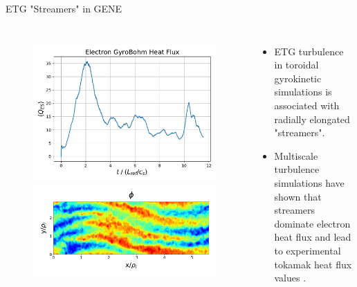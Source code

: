 \documentclass[aspectratio=43]{beamer}
\begin{document}
   \begin{frame}{ETG "Streamers" in GENE}
      \begin{columns}
         \begin{figure}
            \hspace*{-.3cm}\includegraphics[scale=.3]{Images/etgHeatFlux.pdf}
            \hspace*{-.3cm}\includegraphics[scale=.2]{Images/genePhiETG_sat2.pdf}
         \end{figure}
         \begin{itemize}
            \item ETG turbulence in toroidal gyrokinetic simulations is associated with radially elongated "streamers".
            \vspace{5mm}
            \item Multiscale turbulence simulations have shown that streamers dominate electron heat flux and lead
            to experimental tokamak heat flux values \cite{Howard}.
         \end{itemize}
      \end{columns}
   \end{frame}
\end{document}
